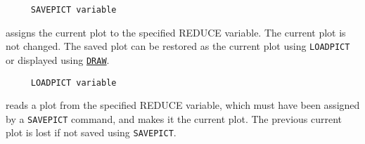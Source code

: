\begin{verbatim}
     SAVEPICT variable
\end{verbatim}
\label{logoturtle:savepict}
assigns the current plot to the specified REDUCE variable.  The
current plot is not changed.  The saved plot can be restored as the
current plot using \texttt{LOADPICT} or displayed using
\hyperref[logoturtle:draw]{\texttt{DRAW}}.

\begin{verbatim}
     LOADPICT variable
\end{verbatim}
reads a plot from the specified REDUCE variable, which must have been
assigned by a \texttt{SAVEPICT} command, and makes it the current
plot.  The previous current plot is lost if not saved using
\texttt{SAVEPICT}.

